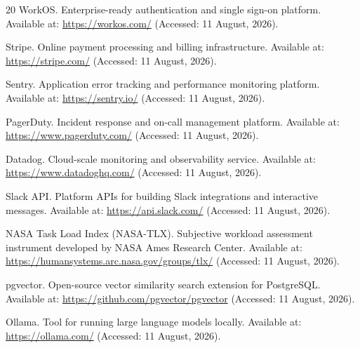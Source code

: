 \begin{thebibliography}{20}
WorkOS. Enterprise-ready authentication and single sign-on platform. Available at: \url{https://workos.com/} (Accessed: 11 August, 2026).

Stripe. Online payment processing and billing infrastructure. Available at: \url{https://stripe.com/} (Accessed: 11 August, 2026).

Sentry. Application error tracking and performance monitoring platform. Available at: \url{https://sentry.io/} (Accessed: 11 August, 2026).

PagerDuty. Incident response and on-call management platform. Available at: \url{https://www.pagerduty.com/} (Accessed: 11 August, 2026).

Datadog. Cloud-scale monitoring and observability service. Available at: \url{https://www.datadoghq.com/} (Accessed: 11 August, 2026).

Slack API. Platform APIs for building Slack integrations and interactive messages. Available at: \url{https://api.slack.com/} (Accessed: 11 August, 2026).

NASA Task Load Index (NASA-TLX). Subjective workload assessment instrument developed by NASA Ames Research Center. Available at: \url{https://humansystems.arc.nasa.gov/groups/tlx/} (Accessed: 11 August, 2026).

pgvector. Open-source vector similarity search extension for PostgreSQL. Available at: \url{https://github.com/pgvector/pgvector} (Accessed: 11 August, 2026).

Ollama. Tool for running large language models locally. Available at: \url{https://ollama.com/} (Accessed: 11 August, 2026).

\end{thebibliography}
